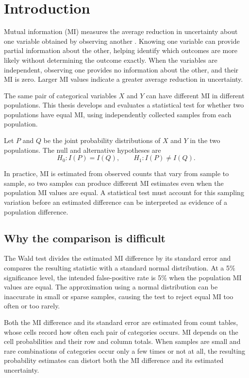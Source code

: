 \chapter{Introduction}
\label{chap:introduction}

Mutual information (MI) measures the average reduction in uncertainty about
one variable obtained by observing another \citep{bossomaier2016}.
Knowing one variable can provide partial information about the other,
helping identify which outcomes are more likely without determining the
outcome exactly. When the variables are independent, observing one provides
no information about the other, and their MI is zero. Larger MI values
indicate a greater average reduction in uncertainty.

The same pair of categorical variables \(X\) and \(Y\) can have different MI
in different populations. This thesis develops and evaluates a statistical
test for whether two populations have equal MI, using independently
collected samples from each population.

Let \(P\) and \(Q\) be the joint probability distributions of \(X\) and
\(Y\) in the two populations. The null and alternative hypotheses are
\begin{equation}
  H_0:I(P)=I(Q),
  \qquad H_1:I(P)\ne I(Q).
  \label{eq:introduction-null}
\end{equation}

In practice, MI is estimated from observed counts that vary from sample
to sample, so two samples can produce different MI estimates even when
the population MI values are equal. A statistical
test must account for this sampling variation before an estimated
difference can be interpreted as evidence of a population difference.

\section{Why the comparison is difficult}

The Wald test \citep{wald1943,vanderVaart1998} divides the estimated
MI difference by its standard error and compares the resulting statistic
with a standard normal distribution. At a 5\% significance level, the
intended false-positive rate is 5\% when the population MI values are
equal. The approximation using a normal distribution can be inaccurate in
small or sparse samples, causing the test to reject equal MI too often or
too rarely.

Both the MI difference and its standard error are estimated from count
tables, whose cells record how often each pair of categories occurs.
MI depends on the cell probabilities and their row and column totals.
When samples are small and rare combinations of categories occur only a
few times or not at all, the resulting probability estimates can distort
both the MI difference and its estimated uncertainty.

